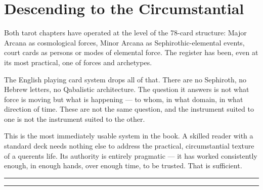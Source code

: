 \section{Descending to the Circumstantial}\label{between-chapters-two-and-three}

Both tarot chapters have operated at the level of the 78-card structure: Major Arcana as cosmological forces, Minor Arcana as Sephirothic-elemental events, court cards as persons or modes of elemental force. The register has been, even at its most practical, one of forces and archetypes.

The English playing card system drops all of that. There are no Sephiroth, no Hebrew letters, no Qabalistic architecture. The question it answers is not what force is moving but what is happening --- to whom, in what domain, in what direction of time. These are not the same question, and the instrument suited to one is not the instrument suited to the other.

This is the most immediately usable system in the book. A skilled reader with a standard deck needs nothing else to address the practical, circumstantial texture of a querent\textquotesingle s life. Its authority is entirely pragmatic --- it has worked consistently enough, in enough hands, over enough time, to be trusted. That is sufficient.

\begin{center}\rule{0.5\linewidth}{0.5pt}\end{center}

\begin{center}\rule{0.5\linewidth}{0.5pt}\end{center}
